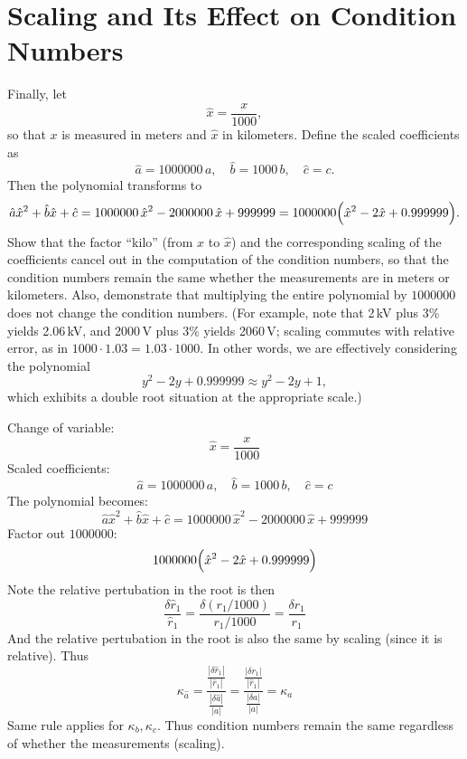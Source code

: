 \documentclass[lang=cn,11pt]{elegantbook}
\begin{document}
\section{Scaling and Its Effect on Condition Numbers}
Finally, let
\[
\hat{x}=\frac{x}{1000},
\]
so that \(x\) is measured in meters and \(\hat{x}\) in kilometers. Define the scaled coefficients as
\[
\hat{a}=1000000\,a,\quad \hat{b}=1000\,b,\quad \hat{c}=c.
\]
Then the polynomial transforms to
\[
\hat{a}\hat{x}^2+\hat{b}\hat{x}+\hat{c} = 1000000\,\hat{x}^2 - 2000000\,\hat{x} + 999999 = 1000000\Bigl(\hat{x}^2-2\hat{x}+0.999999\Bigr).
\]
Show that the factor ``kilo'' (from \(x\) to \(\hat{x}\)) and the corresponding scaling of the coefficients cancel out in the computation of the condition numbers, so that the condition numbers remain the same whether the measurements are in meters or kilometers. Also, demonstrate that multiplying the entire polynomial by \(1000000\) does not change the condition numbers. (For example, note that 2\,kV plus 3\% yields 2.06\,kV, and 2000\,V plus 3\% yields 2060\,V; scaling commutes with relative error, as in \(1000\cdot1.03=1.03\cdot1000\). In other words, we are effectively considering the polynomial
\[
y^2-2y+0.999999\approx y^2-2y+1,
\]
which exhibits a double root situation at the appropriate scale.)

\begin{solution}
Change of variable: \[
\hat{x}=\frac{x}{1000}
\]
Scaled coefficients: \[
\hat{a}=1000000\,a,\quad \hat{b}=1000\,b,\quad \hat{c}=c
\]
The polynomial becomes: \[
\hat{a}\hat{x}^2+\hat{b}\hat{x}+\hat{c}=1000000\,\hat{x}^2-2000000\,\hat{x}+999999
\]
Factor out $1000000$: \[
1000000\Bigl(\hat{x}^2-2\hat{x}+0.999999\Bigr)
\]
Note the relative pertubation in the root is then  \[
   \frac{\delta \hat{r}_1}{\hat{r}_1}=\frac{\delta (r_1/1000)}{r_1/1000}=\frac{\delta r_1}{r_1}
   \]
And the relative pertubation in the root is also the same by scaling (since it is relative). Thus \[
   \kappa_{\hat{a}}=\frac{\displaystyle \frac{|\delta \hat{r}_1|}{|\hat{r}_1|}}{\displaystyle \frac{|\delta \hat{a}|}{|{a}|}} = \frac{\displaystyle \frac{|\delta {r}_1|}{|\hat{r}_1|}}{\displaystyle \frac{|\delta {a}|}{|{a}|}} = \kappa_{{a}}
   \]
Same rule applies for $\kappa_{{b}}, \kappa_{{c}}$. Thus condition numbers remain the same regardless of whether the measurements (scaling).
\end{solution}
\end{document}
